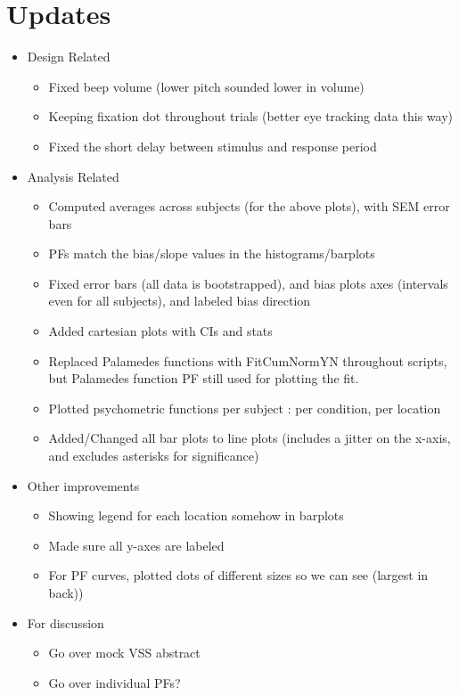 \documentclass[11pt]{article} %
\begin{document}
\section{Updates} 
\begin{itemize}
\item Design Related
	\begin{itemize}
	\item Fixed beep volume (lower pitch sounded lower in volume)
	\item Keeping fixation dot throughout trials (better eye tracking data this way)
	\item Fixed the short delay between stimulus and response period
	\end{itemize}
\item Analysis Related
	\begin{itemize}
	\item Computed averages across subjects (for the above plots), with SEM error bars
	\item PFs match the bias/slope values in the histograms/barplots
	\item Fixed error bars (all data is bootstrapped), and bias plots axes (intervals even for all subjects), and labeled bias direction
	\item Added cartesian plots with CIs and stats
	\item Replaced Palamedes functions with FitCumNormYN throughout scripts, but Palamedes function PF still used for plotting the fit.
	\item Plotted psychometric functions per subject : per condition, per location
	\item Added/Changed all bar plots to line plots (includes a jitter on the x-axis, and excludes asterisks for significance)
	\end{itemize}
\item Other improvements
	\begin{itemize}
	\item Showing legend for each location somehow in barplots
	\item Made sure all y-axes are labeled
	\item For PF curves, plotted dots of different sizes so we can see (largest in back))
	\end{itemize}
\item For discussion
	\begin{itemize}
	\item Go over mock VSS abstract
	\item Go over individual PFs?

\end{itemize}
\end{itemize}
\end{document}
